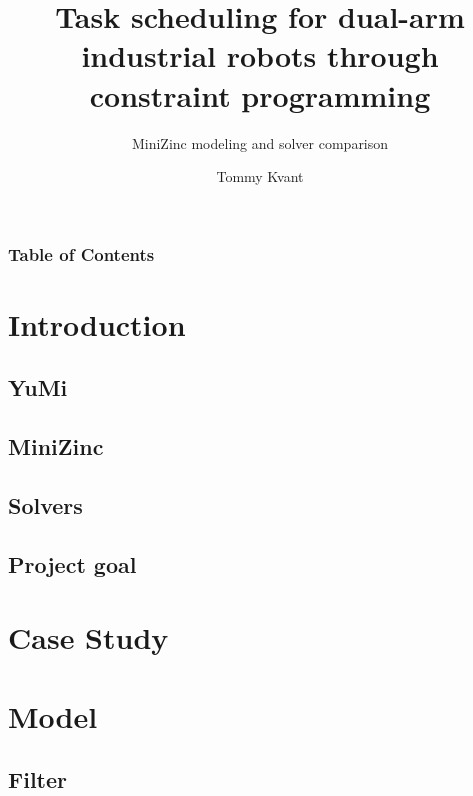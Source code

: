 \documentclass{beamer}
\begin{document}
\title{Task scheduling for dual-arm industrial robots through constraint programming}
\subtitle{MiniZinc modeling and solver comparison}
\author{Tommy Kvant}
\subject{Computer Science}

\frame{\titlepage}

\begin{frame}
\frametitle{Table of Contents}
\tableofcontents
\end{frame}

\section{Introduction}

\subsection{YuMi\textsuperscript\textregistered}

\subsection{MiniZinc}

\subsection{Solvers}

\subsection{Project goal}

\section{Case Study}

\section{Model}

\subsection{Filter}
\end{document}

